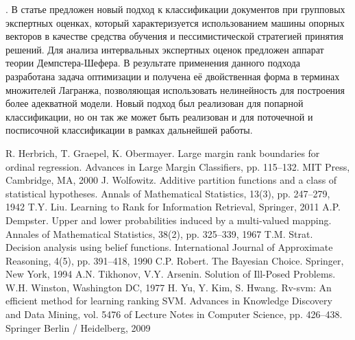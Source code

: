 \documentclass[10pt,a5paper,oneside]{article}
\begin{document}

\par
{}. 
В статье предложен новый подход к классификации документов при групповых экспертных оценках, который характеризуется использованием машины опорных векторов в качестве средства обучения и пессимистической стратегией принятия решений. 
Для анализа интервальных экспертных оценок предложен аппарат теории Демпстера-Шефера. 
В результате применения данного подхода разработана задача оптимизации и получена её двойственная форма в терминах множителей Лагранжа, позволяющая использовать нелинейность для построения более адекватной модели. 
Новый подход был реализован для попарной классификации, но он так же может быть реализован и для поточечной и посписочной классификации в рамках дальнейшей работы.  


\begin{thebibliography}{9}
	 R. Herbrich, T. Graepel, K. Obermayer. Large margin rank boundaries for ordinal regression. Advances in Large Margin Classifiers, pp. 115–132. MIT Press, Cambridge, MA, 2000%
	 J. Wolfowitz. Additive partition functions and a class of statistical hypotheses. Annals of Mathematical Statistics, 13(3), pp. 247–279, 1942%
	 T.Y. Liu. Learning to Rank for Information Retrieval, Springer, 2011%
	 A.P. Dempster. Upper and lower probabilities induced by a multi-valued mapping. Annales of Mathematical Statistics, 38(2), pp. 325–339, 1967%
	 T.M. Strat. Decision analysis using belief functions. International Journal of Approximate Reasoning, 4(5), pp. 391–418, 1990%
	 C.P. Robert. The Bayesian Choice. Springer, New York, 1994%
	 A.N. Tikhonov, V.Y. Arsenin. Solution of Ill-Posed Problems. W.H. Winston, Washington DC, 1977%
	 H. Yu, Y. Kim, S. Hwang. Rv-svm: An efficient method for learning ranking SVM. Advances in Knowledge Discovery and Data Mining, vol. 5476 of Lecture Notes in Computer Science, pp. 426–438. Springer Berlin / Heidelberg, 2009%
\end{thebibliography}

\end{document}
